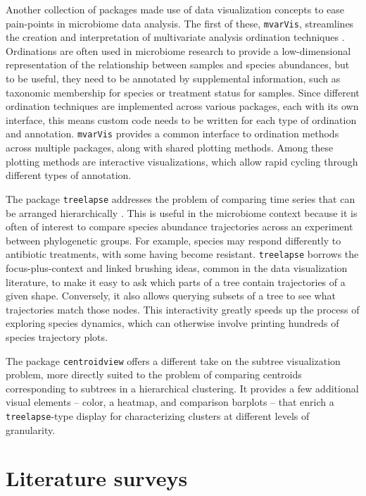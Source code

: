 \documentclass{article}
\begin{document}
Another collection of packages made use of data visualization concepts to ease
pain-points in microbiome data analysis. The first of these, \texttt{mvarVis},
streamlines the creation and interpretation of multivariate analysis ordination
techniques \citep{mvarvis}. Ordinations are often used in microbiome research to
provide a low-dimensional representation of the relationship between samples and
species abundances, but to be useful, they need to be annotated by supplemental
information, such as taxonomic membership for species or treatment status for
samples. Since different ordination techniques are implemented across various
packages, each with its own interface, this means custom code needs to be
written for each type of ordination and annotation. \texttt{mvarVis} provides a
common interface to ordination methods across multiple packages, along with
shared plotting methods. Among these plotting methods are interactive
visualizations, which allow rapid cycling through different types of annotation.

The package \texttt{treelapse} addresses the problem of comparing time series
that can be arranged hierarchically \citep{Sankaran2017}. This is useful in the
microbiome context because it is often of interest to compare species abundance
trajectories across an experiment between phylogenetic groups. For example,
species may respond differently to antibiotic treatments, with some having
become resistant. \texttt{treelapse} borrows the focus-plus-context and linked
brushing ideas, common in the data visualization literature, to make it easy to
ask which parts of a tree contain trajectories of a given shape. Conversely, it
also allows querying subsets of a tree to see what trajectories match those
nodes. This interactivity greatly speeds up the process of exploring species
dynamics, which can otherwise involve printing hundreds of species trajectory
plots.

The package \texttt{centroidview} offers a different take on the subtree
visualization problem, more directly suited to the problem of comparing
centroids corresponding to subtrees in a hierarchical clustering. It provides a
few additional visual elements -- color, a heatmap, and comparison barplots --
that enrich a \texttt{treelapse}-type display for characterizing clusters at
different levels of granularity.

\section{Literature surveys}
\end{document}
